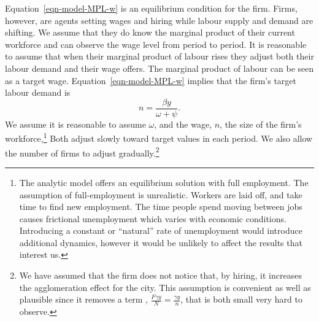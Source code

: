 Equation~\ref{eqn-model-MPL-w} is an equilibrium condition for the firm. Firms, however,  are agents setting wages and hiring while labour supply and demand are shifting.    We assume that they do know the marginal product of their current workforce and can observe the wage level from period to period. It is reasonable to assume that when their marginal product of labour rises they adjust both their labour demand and their wage offers. The marginal product of labour can be seen as a target wage. Equation~\ref{eqn-model-MPL-w} implies that the firm's target labour demand is 
\begin{equation}
           n  = \frac{\beta y}{\omega + \psi}.
\label{eqn-labour-demand}
\end{equation}
We assume it is reasonable to assume $\omega$, and the wage, $n$, the size of the firm's workforce,\footnote{The analytic model offers an equilibrium solution with full employment. The assumption of full-employment is unrealistic. Workers are laid off, and take time to find new employment. The time people spend moving between jobs causes frictional unemployment which varies with economic conditions. Introducing a constant or ``natural'' rate of unemployment would introduce additional dynamics, however it would be unlikely to affect the results that interest us.} 
Both adjust slowly toward target values in each period. We also allow the number of firms to adjust gradually.\footnote{We have assumed that the firm does not notice that, by hiring, it increases the agglomeration effect for the city. This assumption is convenient as well as plausible since it removes a term , $\frac{F\gamma y}{N} =\frac{\gamma y}{n}$, that is both small very hard to observe.}





